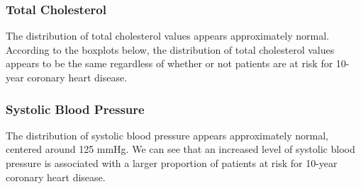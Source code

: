 \documentclass[10pt]{article}
\begin{document}
\subsubsection*{Total Cholesterol}

The distribution of total cholesterol values appears approximately normal. According to the boxplots below, the distribution of total cholesterol values appears to be the same regardless of whether or not patients are at risk for 10-year coronary heart disease.

\begin{figure}[hbt!]
\hspace*{\fill}
\centering
{}\hspace{2em}%
%
\hspace*{\fill}
\end{figure}



\subsubsection*{Systolic Blood Pressure}

The distribution of systolic blood pressure appears approximately normal, centered around 125 mmHg. We can see that an increased level of systolic blood pressure is associated with a larger proportion of patients at risk for 10-year coronary heart disease. 
\end{document}
